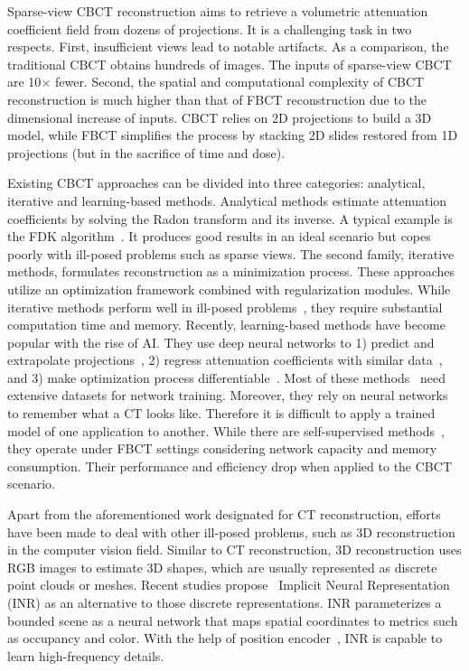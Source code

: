 \documentclass[runningheads]{llncs}
\begin{document}
Sparse-view CBCT reconstruction aims to retrieve a volumetric attenuation coefficient field from dozens of projections. It is a challenging task in two respects. First, insufficient views lead to notable artifacts. As a comparison, the traditional CBCT obtains hundreds of images. The inputs of sparse-view CBCT are 10$\times$ fewer. Second, the spatial and computational complexity of CBCT reconstruction is much higher than that of FBCT reconstruction due to the dimensional increase of inputs. CBCT relies on 2D projections to build a 3D model, while FBCT simplifies the process by stacking 2D slides restored from 1D projections (but in the sacrifice of time and dose).

Existing CBCT approaches can be divided into three categories: analytical, iterative and learning-based methods. Analytical methods estimate attenuation coefficients by solving the Radon transform and its inverse. A typical example is the FDK algorithm~\cite{feldkamp1984practical}. It produces good results in an ideal scenario but copes poorly with ill-posed problems such as sparse views. The second family, iterative methods, formulates reconstruction as a minimization process. These approaches utilize an optimization framework combined with regularization modules. While iterative methods perform well in ill-posed problems~\cite{andersen1984simultaneous,sidky2008image}, they require substantial computation time and memory. Recently, learning-based methods have become popular with the rise of AI. They use deep neural networks to 1) predict and extrapolate projections~\cite{anirudh2018lose,tang2019projection,wang2021improving,zang2021intratomo}, 2) regress attenuation coefficients with similar data~\cite{kasten2020end,ying2019x2ct}, and 3) make optimization process differentiable~\cite{adler2018learned,chen2017learned,kang2018deep}. Most of these methods~\cite{anirudh2018lose,kasten2020end,tang2019projection,ying2019x2ct} need extensive datasets for network training. Moreover, they rely on neural networks to remember what a CT looks like. Therefore it is difficult to apply a trained model of one application to another. While there are self-supervised methods~\cite{adler2018learned,zang2021intratomo}, they operate under FBCT settings considering network capacity and memory consumption. Their performance and efficiency drop when applied to the CBCT scenario.


Apart from the aforementioned work designated for CT reconstruction, efforts have been made to deal with other ill-posed problems, such as 3D reconstruction in the computer vision field. Similar to CT reconstruction, 3D reconstruction uses RGB images to estimate 3D shapes, which are usually represented as discrete point clouds or meshes. Recent studies propose~\cite{mildenhall2020nerf,park2019deepsdf} Implicit Neural Representation (INR) as an alternative to those discrete representations. INR parameterizes a bounded scene as a neural network that maps spatial coordinates to metrics such as occupancy and color. With the help of position encoder~\cite{mueller2022instant,tancik2020fourier}, INR is capable to learn high-frequency details.
\end{document}
